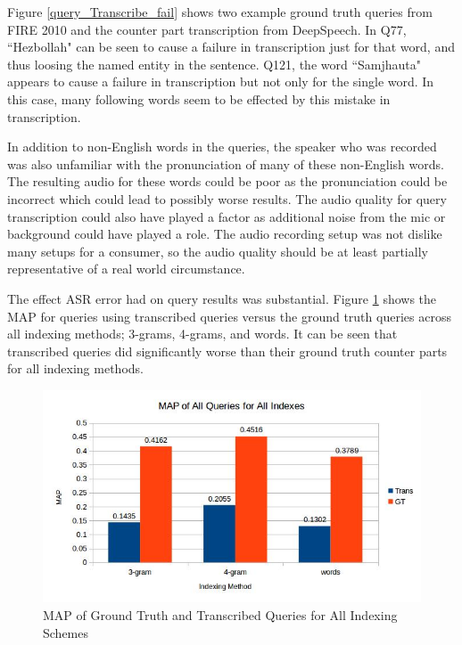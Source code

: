\documentclass[jair, twoside,11pt,theapa]{article}
\begin{document}
Figure \ref{query_Transcribe_fail} shows two example ground truth queries from FIRE 2010 and the counter part transcription from DeepSpeech. In Q77, ``Hezbollah" can be seen to cause a failure in transcription just for that word, and thus loosing the named entity in the sentence. Q121, the word ``Samjhauta" appears to cause a failure in transcription but not only for the single word. In this case, many following words seem to be effected by this mistake in transcription. 

In addition to non-English words in the queries, the speaker who was recorded was also unfamiliar with the pronunciation of many of these non-English words. The resulting audio for these words could be poor as the pronunciation could be incorrect which could lead to possibly worse results. The audio quality for query transcription could also have played a factor as additional noise from the mic or background could have played a role. The audio recording setup was not dislike many setups for a consumer, so the audio quality should be at least partially representative of a real world circumstance.  

The effect ASR error had on query results was substantial. Figure \ref{fig:MAP_all} shows the MAP for queries using transcribed queries versus the ground truth queries across all indexing methods; 3-grams, 4-grams, and words. It can be seen that transcribed queries did significantly worse than their ground truth counter parts for all indexing methods.


\begin{figure}[h!]
\centering
\includegraphics[width=1.0\linewidth]{../ResultImages/MAP}
\vspace{-3em}
\caption{MAP of Ground Truth and Transcribed Queries for All Indexing Schemes}
\label{fig:MAP_all}
\end{figure}
\end{document}
